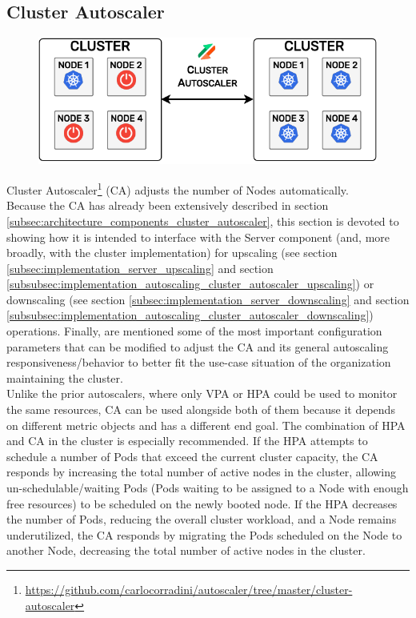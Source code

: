 \subsection{Cluster Autoscaler}
\label{subsec:implementation_autoscaling_cluster_autoscaler}

\begin{figure}
  \centering
  \includegraphics[width=\linewidth]{
    images/implementation/cluster_autoscaler.pdf
  }
\end{figure}

Cluster Autoscaler\footnote{\url{https://github.com/carlocorradini/autoscaler/tree/master/cluster-autoscaler}}
(CA) adjusts the number of Nodes automatically. \\ %

Because the CA has already been extensively described in section
\ref{subsec:architecture_components_cluster_autoscaler}, this section is devoted
to showing how it is intended to interface with the Server component (and, more broadly,
with the cluster implementation) for upscaling (see section
\ref{subsec:implementation_server_upscaling} and section
\ref{subsubsec:implementation_autoscaling_cluster_autoscaler_upscaling}) or downscaling
(see section \ref{subsec:implementation_server_downscaling} and section
\ref{subsubsec:implementation_autoscaling_cluster_autoscaler_downscaling}) operations.
Finally, are mentioned some of the most important configuration parameters that can
be modified to adjust the CA and its general autoscaling responsiveness/behavior
to better fit the use-case situation of the organization maintaining the cluster.
\\ %
Unlike the prior autoscalers, where only VPA or HPA could be used to monitor the
same resources, CA can be used alongside both of them because it depends on different
metric objects and has a different end goal. The combination of HPA and CA in
the cluster is especially recommended. If the HPA attempts to schedule a number of
Pods that exceed the current cluster capacity, the CA responds by increasing the
total number of active nodes in the cluster, allowing un-schedulable/waiting Pods
(Pods waiting to be assigned to a Node with enough free resources) to be scheduled
on the newly booted node. If the HPA decreases the number of Pods, reducing the overall
cluster workload, and a Node remains underutilized, the CA responds by migrating
the Pods scheduled on the Node to another Node, decreasing the total number of
active nodes in the cluster\cite{hpa_ca}.

